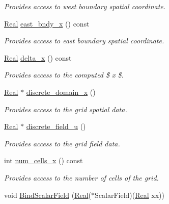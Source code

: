 \begin{DoxyCompactItemize}
\begin{DoxyCompactList}\small\item\em Provides access to west boundary spatial coordinate. \end{DoxyCompactList}\item 
\hyperlink{group__c01-roots_gac080bbbf5cbb5502c9f00405f894857d}{Real} \hyperlink{classmtk_1_1UniStgGrid1D_a3b413aeadcc3d3263f6817f3af1dee95}{east\+\_\+bndy\+\_\+x} () const 
\begin{DoxyCompactList}\small\item\em Provides access to east boundary spatial coordinate. \end{DoxyCompactList}\item 
\hyperlink{group__c01-roots_gac080bbbf5cbb5502c9f00405f894857d}{Real} \hyperlink{classmtk_1_1UniStgGrid1D_a6e7173b01241632cf509496d66b9f74c}{delta\+\_\+x} () const 
\begin{DoxyCompactList}\small\item\em Provides access to the computed \$  x \$. \end{DoxyCompactList}\item 
\hyperlink{group__c01-roots_gac080bbbf5cbb5502c9f00405f894857d}{Real} $\ast$ \hyperlink{classmtk_1_1UniStgGrid1D_a858a63163d7f324ee2c79b1bed51402f}{discrete\+\_\+domain\+\_\+x} ()
\begin{DoxyCompactList}\small\item\em Provides access to the grid spatial data. \end{DoxyCompactList}\item 
\hyperlink{group__c01-roots_gac080bbbf5cbb5502c9f00405f894857d}{Real} $\ast$ \hyperlink{classmtk_1_1UniStgGrid1D_acf28d702f6e702599986afcb253bbfc1}{discrete\+\_\+field\+\_\+u} ()
\begin{DoxyCompactList}\small\item\em Provides access to the grid field data. \end{DoxyCompactList}\item 
int \hyperlink{classmtk_1_1UniStgGrid1D_af1b3729d8afa07be5b2775ed68015b80}{num\+\_\+cells\+\_\+x} () const 
\begin{DoxyCompactList}\small\item\em Provides access to the number of cells of the grid. \end{DoxyCompactList}\item 
void \hyperlink{classmtk_1_1UniStgGrid1D_a438cda229830d0e2f35c615e70b59a76}{Bind\+Scalar\+Field} (\hyperlink{group__c01-roots_gac080bbbf5cbb5502c9f00405f894857d}{Real}($\ast$Scalar\+Field)(\hyperlink{group__c01-roots_gac080bbbf5cbb5502c9f00405f894857d}{Real} xx))

\end{DoxyCompactItemize}
